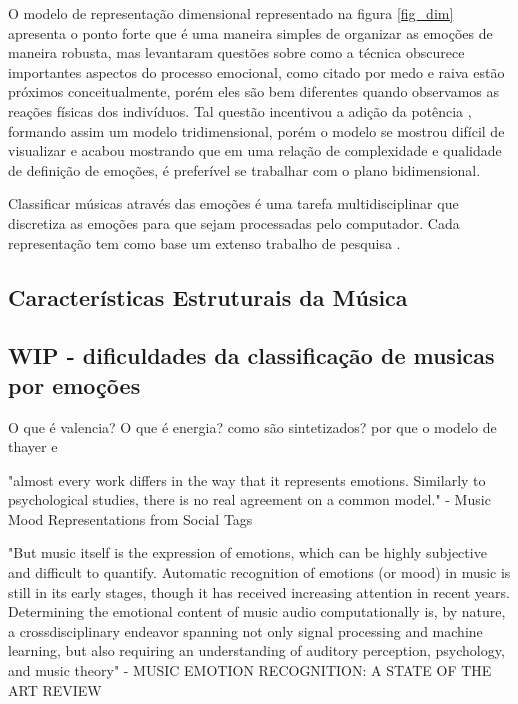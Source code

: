 \documentclass[
	12pt,				%
	openright,			%
	oneside,
	a4paper,			%
	english,			%
	french,				%
	spanish,			%
	brazil				%
	]{abntex2}
\begin{document}
O modelo de representação dimensional representado na figura \ref{fig_dim} apresenta o ponto forte que é uma maneira simples de organizar as emoções de maneira robusta, mas  levantaram questões sobre como a técnica obscurece importantes aspectos do processo emocional, como citado por  medo e raiva estão próximos conceitualmente, porém eles são bem diferentes quando observamos as reações físicas dos indivíduos. Tal questão incentivou a adição da potência \cite{bigand2005multidimensional}, formando assim um modelo tridimensional, porém o modelo se mostrou difícil de visualizar e acabou mostrando que em uma relação de complexidade e qualidade de definição de emoções, é preferível se trabalhar com o plano bidimensional\cite{juslin2001music}.

Classificar músicas através das emoções é uma tarefa multidisciplinar que discretiza as emoções para que sejam processadas pelo computador. Cada representação tem como base um extenso trabalho de pesquisa \cite{kim2010music}. 

\subsection{Características Estruturais da Música}


\subsection{WIP - dificuldades da classificação de musicas por emoções}
O que é valencia?
O que é energia?
como são sintetizados?
por que o modelo de thayer e 

"almost every work differs in the way that it represents emotions. Similarly to psychological studies, there
is no real agreement on a common model." - Music Mood Representations from Social Tags

"But music itself is the expression of emotions, which can be highly subjective and difficult to quantify. Automatic recognition of emotions (or mood) in music is still in its early stages, though it has received increasing attention in recent years. Determining the emotional content of music audio computationally is, by nature, a crossdisciplinary endeavor spanning not only signal processing
and machine learning, but also requiring an understanding of auditory perception, psychology, and music theory" - MUSIC EMOTION RECOGNITION: A STATE OF THE ART REVIEW
\end{document}
